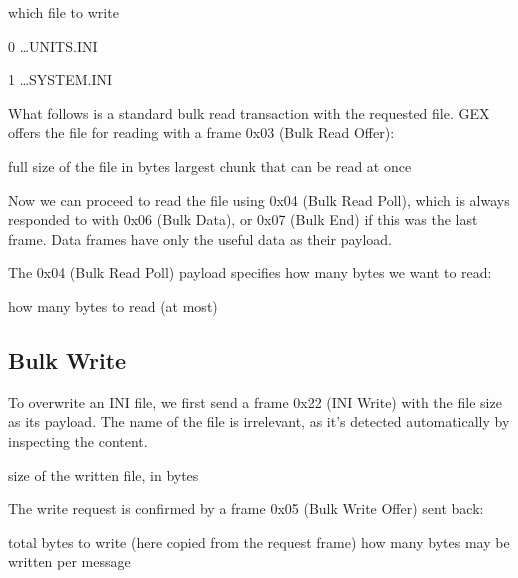 \begin{boxedpayload}
	 which file to write
		\begin{pldlist}
			\item 0 \dots UNITS.INI
			\item 1 \dots SYSTEM.INI
		\end{pldlist}
\end{boxedpayload}

What follows is a standard bulk read transaction with the requested file.
GEX offers the file for reading with a frame 0x03 (Bulk Read Offer):

\begin{boxedpayload}
	 full size of the file in bytes
	 largest chunk that can be read at once
\end{boxedpayload}

Now we can proceed to read the file using 0x04 (Bulk Read Poll), which is always responded to with 0x06 (Bulk Data), or 0x07 (Bulk End) if this was the last frame. Data frames have only the useful data as their payload.

The 0x04 (Bulk Read Poll) payload specifies how many bytes we want to read:

\begin{boxedpayload}
	 how many bytes to read (at most)
\end{boxedpayload}

\subsection{Bulk Write}

To overwrite an INI file, we first send a frame 0x22 (INI Write) with the file size as its payload. The name of the file is irrelevant, as it's detected automatically by inspecting the content.

\begin{boxedpayload}
	 size of the written file, in bytes
\end{boxedpayload}

The write request is confirmed by a frame 0x05 (Bulk Write Offer) sent back:

\begin{boxedpayload}
	 total bytes to write (here copied from the request frame)
	 how many bytes may be written per message
\end{boxedpayload}


